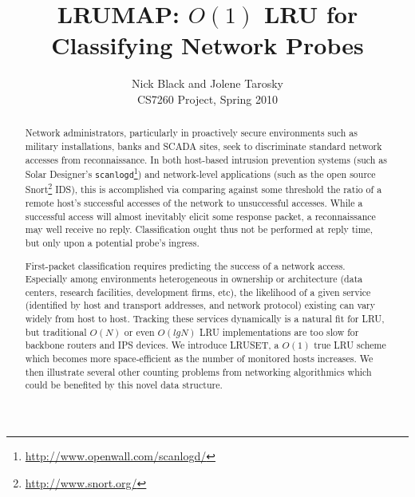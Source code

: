 \documentclass[letterpaper,10pt]{article}
\title{LRUMAP: $O(1)$ LRU for Classifying Network Probes}
\author{Nick Black and Jolene Tarosky\\
CS7260 Project, Spring 2010}
\date{}
\begin{document}
\maketitle

\begin{abstract}
Network administrators, particularly in proactively secure environments such
as military installations, banks and SCADA sites, seek to discriminate standard
network accesses from reconnaissance. In both host-based intrusion prevention
systems (such as Solar Designer's \texttt{scanlogd}\footnote{\url{http://www.openwall.com/scanlogd/}})
and network-level applications (such as the open source Snort\footnote{\url{http://www.snort.org/}} IDS),
this is accomplished via comparing against some threshold the ratio of a remote
host's successful accesses of the network to unsuccessful accesses. While a
successful access will almost inevitably elicit some response packet, a
reconnaissance may well receive no reply. Classification ought thus not be performed
at reply time, but only upon a potential probe's ingress.

First-packet classification requires predicting the success of a network access.
Especially among environments heterogeneous in ownership or architecture (data centers, research facilities,
development firms, etc), the likelihood of a given service (identified by host
and transport addresses, and network protocol) existing can vary widely from
host to host. Tracking these services dynamically is a natural fit for LRU, but
traditional $O(N)$ or even $O(lgN)$ LRU implementations are too slow for
backbone routers and IPS devices. We introduce LRUSET, a $O(1)$ true LRU scheme
which becomes more space-efficient as the number of monitored hosts increases.
We then illustrate several other counting problems from networking algorithmics
which could be benefited by this novel data structure.
\end{abstract}
\end{document}
